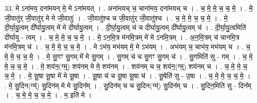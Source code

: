 \documentclass[17pt]{extarticle}
\begin{document}
33. मे ऽना॑मय॒ दना॑मयन् मे॒ मे ऽना॑मयत् । . अना॑मयच् च॒ चाना॑मय॒ दना॑मयच् च । . च॒ मे॒ मे॒ च॒ च॒ मे॒ । . मे॒ जी॒वातु॑र् जी॒वातु॑र् मे मे जी॒वातुः॑ । . जी॒वातु॑श्च च जी॒वातु॑र् जी॒वातु॑श्च । . च॒ मे॒ मे॒ च॒ च॒ मे॒ । . मे॒ दी॒र्घा॒यु॒त्वम् दी᳚र्घायु॒त्वम् मे॑ मे दीर्घायु॒त्वम् । . दी॒र्घा॒यु॒त्वम् च॑ च दीर्घायु॒त्वम् दी᳚र्घायु॒त्वम् च॑ । . दी॒र्घा॒यु॒त्वमिति॑ दीर्घायु - त्वम् । . च॒ मे॒ मे॒ च॒ च॒ मे॒ । . मे॒ ऽन॒मि॒त्र म॑नमि॒त्रम् मे॑ मे ऽनमि॒त्रम् । . अ॒न॒मि॒त्रम् च॑ चानमि॒त्र म॑नमि॒त्रम् च॑ । . च॒ मे॒ मे॒ च॒ च॒ मे॒ । . मे ऽभ॑य॒ मभ॑यम् मे॒ मे ऽभ॑यम् । . अभ॑यम् च॒ चाभ॑य॒ मभ॑यम् च । . च॒ मे॒ मे॒ च॒ च॒ मे॒ । . मे॒ सु॒गꣳ सु॒गम् मे॑ मे सु॒गम् । . सु॒गम् च॑ च सु॒गꣳ सु॒गम् च॑ । . सु॒गमिति॑ सु - गम् । . च॒ मे॒ मे॒ च॒ च॒ मे॒ । . मे॒ शय॑न॒(ग्म्॒) शय॑नम् मे मे॒ शय॑नम् । . शय॑नम् च च॒ शय॑न॒(ग्म्॒) शय॑नम् च । . च॒ मे॒ मे॒ च॒ च॒ मे॒ । . मे॒ सू॒षा सू॒षा मे॑ मे सू॒षा । . सू॒षा च॑ च सू॒षा सू॒षा च॑ । . सू॒षेति॑ सु - उ॒षा । . च॒ मे॒ मे॒ च॒ च॒ मे॒ । . मे॒ सु॒दिन(ग्म्॑) सु॒दिन॑म् मे मे सु॒दिन᳚म् । . सु॒दिन॑म् च च सु॒दिन(ग्म्॑) सु॒दिन॑म् च । . सु॒दिन॒मिति॑ सु - दिन᳚म् । . च॒ मे॒ मे॒ च॒ च॒ मे॒ । . म॒ इति॑ मे । \newline
\end{document}
